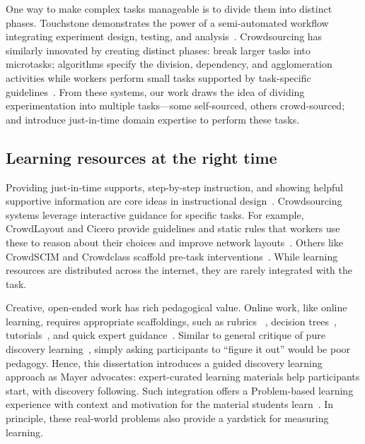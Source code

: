 One way to make complex tasks manageable is to divide them into distinct phases. 
Touchstone demonstrates the power of a semi-automated workflow integrating experiment 
design, testing, and analysis~\cite{Mackay2007}. Crowdsourcing has similarly innovated by 
creating distinct phases: break larger tasks into microtasks; algorithms specify the division, 
dependency, and agglomeration activities while workers perform small tasks supported by 
task-specific guidelines~\cite{lasecki2012real}. From these systems, our work draws the 
idea of dividing experimentation into multiple tasks—some self-sourced, others 
crowd-sourced; and introduce just-in-time domain expertise to perform these tasks. 

 

\subsection{Learning resources at the right time}
Providing just-in-time supports, step-by-step instruction, and showing helpful supportive
 information are core ideas in instructional design~\cite{Kirschner2008}. Crowdsourcing 
systems leverage interactive guidance for specific tasks. For example, CrowdLayout and 
Cicero provide guidelines and static rules that workers use these to reason about their choices
 and improve network layouts~\cite{chen2019cicero, Singh:2018:CCD:3173574.3173806}. 
Others like CrowdSCIM and Crowdclass scaffold pre-task interventions~\cite{Lee2016,wang2018exploring}. 
While learning resources are distributed across the internet, they are rarely integrated with the task. 

Creative, open-ended work has rich pedagogical value. Online work, like 
online learning, requires appropriate scaffoldings, such as rubrics
~\cite{Boud1995, Kulkarni2013peer}, decision trees~\cite{Lee2016,Yu2006}, 
tutorials~\cite{Andersen2012}, and quick expert guidance~\cite{dow2012shepherding}. 
Similar to general critique of pure discovery learning~\cite{Mayer2004}, simply 
asking participants to “figure it out” would be poor pedagogy. Hence, this dissertation
introduces a guided discovery learning approach as Mayer advocates: expert-curated 
learning materials help participants start, with discovery following. Such integration 
offers a Problem-based learning experience with context and 
motivation for the material students learn~\cite{Savery1995}. In principle, these 
real-world problems also provide a yardstick for measuring learning. 

